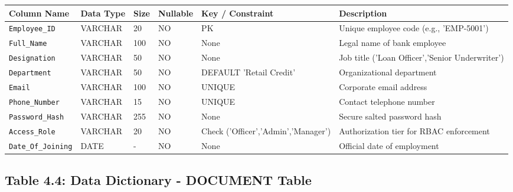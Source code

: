 \documentclass[12pt,a4paper,oneside]{report}
\begin{document}
\begin{table}[htbp]
\centering
\small
\begin{tabularx}{\textwidth}{p{2.5cm} X X X X X}
\toprule
\textbf{Column Name} & \textbf{Data Type} & \textbf{Size} & \textbf{Nullable} & \textbf{Key / Constraint} & \textbf{Description} \\
\midrule
\texttt{Employee\_ID} & VARCHAR & 20 & NO & PK & Unique employee code (e.g., 'EMP-5001') \\
\texttt{Full\_Name} & VARCHAR & 100 & NO & None & Legal name of bank employee \\
\texttt{Designation} & VARCHAR & 50 & NO & None & Job title ('Loan Officer','Senior Underwriter') \\
\texttt{Department} & VARCHAR & 50 & NO & DEFAULT 'Retail Credit' & Organizational department \\
\texttt{Email} & VARCHAR & 100 & NO & UNIQUE & Corporate email address \\
\texttt{Phone\_Number} & VARCHAR & 15 & NO & UNIQUE & Contact telephone number \\
\texttt{Password\_Hash} & VARCHAR & 255 & NO & None & Secure salted password hash \\
\texttt{Access\_Role} & VARCHAR & 20 & NO & Check ('Officer','Admin','Manager') & Authorization tier for RBAC enforcement \\
\texttt{Date\_Of\_Joining} & DATE & - & NO & None & Official date of employment \\
\bottomrule
\end{tabularx}
\end{table}

\subsection{Table 4.4: Data Dictionary - DOCUMENT Table}
\end{document}
